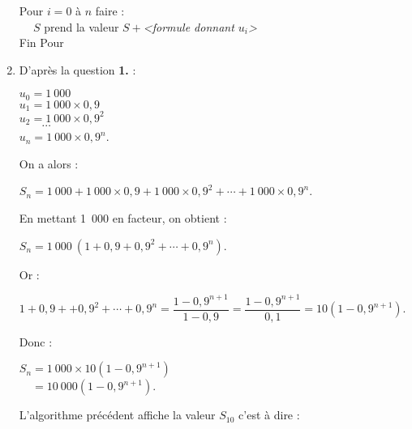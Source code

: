 \begin{corrige}
\begin{enumerate}
{\begin{itemize}
                    \par
                    Pour $i=0$ à $n$ faire :\\
                    $\phantom{-}S$ prend la valeur $S+$\textit{<formule donnant $u_i$>}\\
                    Fin Pour\\
                    \par
               \end{itemize}
          }
          \item
          D'après la question \textbf{1.} :
          \par
          $u_0=1~000$\\
          $u_1=1~000 \times 0,9 $\\
          $u_2=1~000 \times 0,9^2 $\\
          $\qquad \cdots $\\
          $u_n=1~000 \times 0,9^n $.\\
          \par
          On a alors :
          \par
          $S_n=1~000 + 1~000 \times 0,9 + 1~000 \times 0,9^2 +$\nosp$ \cdots + 1~000 \times 0,9^n$.
          \par
          En mettant 1~000 en facteur, on obtient :
          \par
          $S_n=1~000~\left( 1 + 0,9 + 0,9^2 + \cdots + 0,9^n \right)$.
          \par
          Or :
          \par
          $1+0,9++0,9^{2}+\cdots+0,9^{n}=\dfrac{1-0,9^{n+1}}{1-0,9}$\nosp$=\dfrac{1-0,9^{n+1}}{0,1}=10 \left(1-0,9^{n+1} \right)$.
          \par
          Donc :
          \par
          $S_n=1~000 \times 10 \left(1-0,9^{n+1} \right)$\\
          $\phantom{S_n}=10~000 \left( 1-0,9^{n+1} \right)$.
          \par
          \par
          L'algorithme précédent affiche la valeur $S_{10}$ c'est à dire :

\end{enumerate}
\end{corrige}
